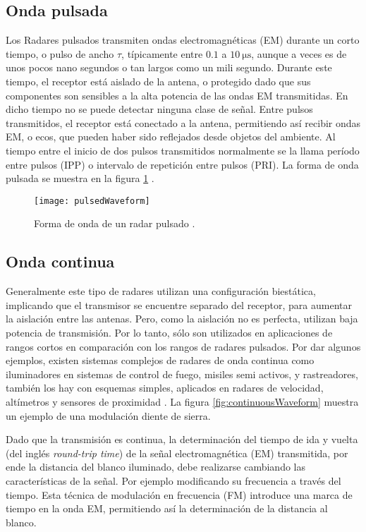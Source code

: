 \subsection{Onda pulsada}

Los Radares pulsados transmiten ondas electromagnéticas (EM) durante un corto tiempo, o pulso de ancho $\tau$, típicamente entre $\num{0.1}$ a $\SI{10}{\us}$, aunque a veces es de unos pocos nano segundos o tan largos como un mili segundo. Durante este tiempo, el receptor está aislado de la antena, o protegido dado que sus componentes son sensibles a la alta potencia de las ondas EM transmitidas. En dicho tiempo no se puede detectar ninguna clase de señal. Entre pulsos transmitidos, el receptor está conectado a la antena, permitiendo así recibir ondas EM, o ecos, que pueden haber sido reflejados desde objetos del ambiente. Al tiempo entre el inicio de dos pulsos transmitidos normalmente se la llama período entre pulsos (IPP) o intervalo de repetición entre pulsos (PRI). La forma de onda pulsada se muestra en la figura \ref{fig:pulsedWaveform} \cite{Richards2010}.

\begin{figure}
 \centering
 \texttt{[image: pulsedWaveform]}
 \caption{Forma de onda de un radar pulsado \cite{Richards2010}.}
 \label{fig:pulsedWaveform}
\end{figure}


\subsection{Onda continua}

Generalmente este tipo de radares utilizan una configuración biestática, implicando que el transmisor se encuentre separado del receptor, para aumentar la aislación entre las antenas. Pero, como la aislación no es perfecta, utilizan baja potencia de transmisión. Por lo tanto, sólo son utilizados en aplicaciones de rangos cortos en comparación con los rangos de radares pulsados. Por dar algunos ejemplos, existen sistemas complejos de radares de onda continua como iluminadores en sistemas de control de fuego, misiles semi activos, y rastreadores, también los hay con esquemas simples, aplicados en radares de velocidad, altímetros y sensores de proximidad \cite{Richards2010}. La figura \ref{fig:continuousWaveform} muestra un ejemplo de una modulación diente de sierra.

Dado que la transmisión es continua, la determinación del tiempo de ida y vuelta (del inglés \textit{round-trip time}) de la señal electromagnética (EM) transmitida, por ende la distancia del blanco iluminado, debe realizarse cambiando las características de la señal. Por ejemplo modificando su frecuencia a través del tiempo. Esta técnica de modulación en frecuencia (FM) introduce una marca de tiempo en la onda EM, permitiendo así la determinación de la distancia al blanco.

